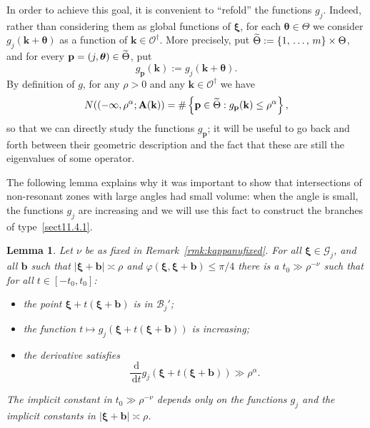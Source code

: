 \documentclass[10pt]{amsart}
\newtheorem{lemm}[theo]{Lemma}\newtheorem{prop}[theo]{Proposition}\newtheorem{coro}[theo]{Corollary}\newtheorem{conj}[theo]{Conjecture}
\theoremstyle{definition}\newtheorem{defi}[theo]{Definition}\newtheorem{rema}[theo]{Remark}\newtheorem{exam}[theo]{Example}\newtheorem{nota}[theo]{Notation}
\newcommand{\de}{\, \mathrm{d}}
\newcommand{\CB}{\mathcal{B}}
\newcommand{\CG}{\mathcal{G}}
\newcommand{\CO}{\mathcal{O}}
\newcommand{\btheta}{\boldsymbol \theta}
\newcommand{\bxi}{\boldsymbol \xi}
\newcommand{\BA}{\mathbf A}
\newcommand{\bbb}{\mathbf b}
\newcommand{\bk}{\mathbf k}
\newcommand{\bp}{\mathbf p}
\renewcommand{\phi}{\varphi}
\newcommand{\abs}[1]{\left\lvert #1 \right\rvert}
\newcommand{\set}[1]{\left\{ #1 \right\}}
\let\oldtilde\tilde
\renewcommand*{\tilde}[1]{\mathchoice{\widetilde{#1}}{\widetilde{#1}}{\oldtilde{#1}}{\oldtilde{#1}}}
\begin{document}
In order to achieve this goal, it is convenient to ``refold'' the functions $g_j$. Indeed, rather than considering them as global functions of $\bxi$, for each $\btheta \in \Theta$ we consider $g_j(\bk+\btheta)$ as a function of $\bk
\in \CO^\dagger$. More precisely, put $\tilde \Theta := \set{1,\,\dotsc,\,m}
\times \Theta$, and for every $\bp = (j,\btheta) \in \tilde \Theta$, put
\begin{equation}
g_\bp(\bk) := g_j(\bk + \btheta).
\end{equation}
By definition of $g$, for any $\rho > 0$ and any $\bk \in \CO^\dagger$ we have
\begin{equation}
N((-\infty, \rho^\alpha;\BA(\bk)) = \#\set{\bp \in \tilde \Theta : g_\bp(\bk) \le \rho^\alpha},
\end{equation}
so that we can directly study the functions $g_\bp$; it will be useful to go back and forth between their geometric description and the fact that these are still the eigenvalues of some operator.

The following lemma explains why it was important to show that intersections of non-resonant zones with large angles had small volume: when the angle is small, the functions $g_j$ are increasing and we will use this fact to construct the branches of type~\eqref{sect11.4.1}.
\begin{lemm} \label{lem:increasing}
Let $\nu$ be as fixed in Remark~\ref{rmk:kappanufixed}. For all $\bxi \in
\CG_j$, and all $\bbb$ such that $\abs{\bxi + \bbb} \asymp \rho$ and $\phi(\bxi,\bxi+\bbb) \le \pi/4$ there is a $t_0 \gg \rho^{-\nu}$ such that for all $t \in [-t_0,t_0]$:
\begin{itemize}
\item the point $\bxi + t(\bxi + \bbb)$ is in $\CB_j'$;
\item the function $t \mapsto g_j(\bxi + t(\bxi + \bbb))$ is increasing;
\item the derivative satisfies
\begin{equation}
\frac{\de}{\de t}g_j(\bxi + t(\bxi + \bbb)) \gg \rho^\alpha.
\end{equation}
\end{itemize}
The implicit constant in $t_0 \gg \rho^{-\nu}$ depends only on the functions $g_j$ and the implicit constants in $\abs{\bxi + \bbb} \asymp
\rho$.
\end{lemm}
\end{document}
